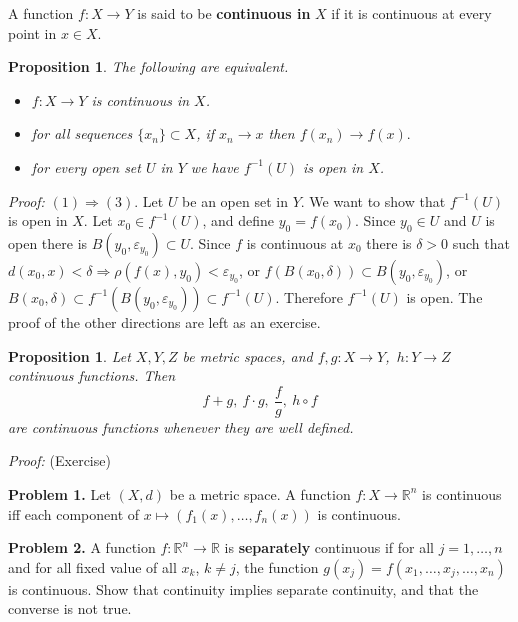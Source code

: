 \documentclass[12pt]{report}
\newtheorem{prop}[theorem]{Proposition}
\begin{document}
\medskip
\noindent
A function $f: X \longrightarrow Y$ is said to be \textbf{continuous
in} $X$ if it is continuous at every point in $x \in X$.

\begin{prop} 
\label{pr:equiv-cont}
The following are equivalent.
\begin{itemize}
\item[(1)] $f: X \longrightarrow Y$  is continuous in  $X$.
\item[(2)]  for all sequences $\{x_n\} \subset X$, if $x_n
\longrightarrow x$ then 
$f(x_n) \to f(x).$
\item[(3)]  for every open set $U$ in $Y$ we have $f^{-1} (U)$
is open in $X$.
\end{itemize}
\end{prop}
\textit{Proof:} \underline{$(1) \Longrightarrow (3)$}.  
Let $U$ be an open
set in $Y$.  We want to show that $f^{-1} (U)$ is open in $X$.
Let $x_0 \in f^{-1}(U)$, and define $y_0=f(x_0)$.
Since $y_0 \in U$ and $U$ is open there is $B(y_0,\varepsilon_{y_0})
\subset U$.
   Since $f$ is continuous at $x_0$
there is $\delta > 0$ such that
$ 
d(x_0, x) < \delta \Longrightarrow \rho (f(x), y_0) <
\varepsilon_{y_0}
$,
or
$
f(B(x_0, \delta)) \subset B(y_0, \varepsilon_{y_0}) 
$,
 or
$
 B(x_0, \delta) \subset f^{-1} (B (y_0, \varepsilon_{y_0})) \subset
f^{-1} (U) .
$
Therefore $f^{-1} (U)$ is open.
The proof of the other directions are left as an exercise.

\begin{prop} 
\label{pr:cont-alg}
 Let $X, Y, Z$ be metric spaces, and $f, g:
X\longrightarrow Y $,  $\,  h: Y
\longrightarrow Z$ continuous functions.  Then
\[ f + g, \ f \cdot  g, \ \frac{f}{g},\  h\circ f
\] are continuous functions whenever they are well defined.
\end{prop}
\textit{Proof:} (Exercise)

\medskip
\noindent
\textbf{Problem 1.}  Let  $(X, d)$ be a metric space.  A function $f: X
\longrightarrow
\mathbb{R}^n$ is continuous iff each component  of $x \longmapsto
(f_1(x), \dots, f_n(x))$ is continuous.

\medskip
\noindent
\textbf{Problem 2.}  A function $f: \mathbb{R}^n \longrightarrow
\mathbb{R}$ is
\textbf{separately} continuous if for all $j = 1, \dots, n$ and for
all fixed value of all  $x_k$, $k \ne j$, the function $g(x_j) = f(x_1,
\dots, x_j, \dots, x_n)$ is continuous.  Show that continuity implies
separate continuity, and that the converse is not true.
\end{document}
